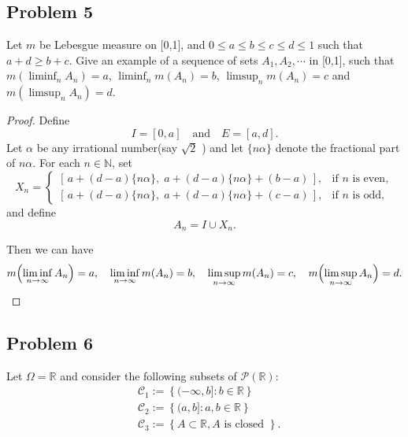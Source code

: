 \documentclass[letterpaper, 11pt]{article}
\newcommand{\1}{\mathds{1}}	%
\theoremstyle{definition}
\begin{document}
\subsection*{Problem 5}
Let $m$ be Lebesgue measure on [0,1], and $0 \leq a \leq b \leq c \leq d \leq 1$ such that $a+d \geq b+c$. Give an example of a sequence of sets $A_1, A_2, \cdots$ in [0,1], such that $m(\liminf_n A_n) = a$, $\liminf_n m(A_n) = b$, $\limsup_n m(A_n) = c$ and $m(\limsup_n A_n) = d$.
\begin{proof}
    
    Define
    \[
    I = [0,a] \quad \text{and} \quad E = [a,d].
    \]
    Let \(\alpha\) be any irrational number(say $ \sqrt{2} $ ) and let \(\{ n\alpha \}\) denote the fractional part of \(n\alpha\). For each \(n\in\mathbb{N}\), set
    \[
    X_n =
    \begin{cases}
    \displaystyle \left[\,a+(d-a)\{n\alpha\},\; a+(d-a)\{n\alpha\}+(b-a)\,\right], & \text{if } n \text{ is even},\\[1ex]
    \displaystyle \left[\,a+(d-a)\{n\alpha\},\; a+(d-a)\{n\alpha\}+(c-a)\,\right], & \text{if } n \text{ is odd},
    \end{cases}
    \]
    and define
    \[
    A_n = I \cup X_n.
    \]
    
    Then we can have
    \[
    m\Bigl(\liminf_{n\to\infty} A_n\Bigr)=a,\quad
    \liminf_{n\to\infty} m(A_n)=b,\quad
    \limsup_{n\to\infty} m(A_n)=c,\quad
    m\Bigl(\limsup_{n\to\infty} A_n\Bigr)=d.
    \]
\end{proof}
\subsection*{Problem 6}
Let $\Omega = \mathbb{R}$ and consider the following subsets of $\mathcal{P}(\mathbb{R})$:
$$\begin{aligned}
& \mathcal{C}_1 := \left\{( -\infty, b] : b \in \mathbb{R} \right\} \\
& \mathcal{C}_2 := \left\{( a, b] : a, b \in \mathbb{R} \right\} \\
& \mathcal{C}_3 := \left\{ A \subset \mathbb{R}, A \text{ is closed } \right\}.
\end{aligned}$$
\end{document}

